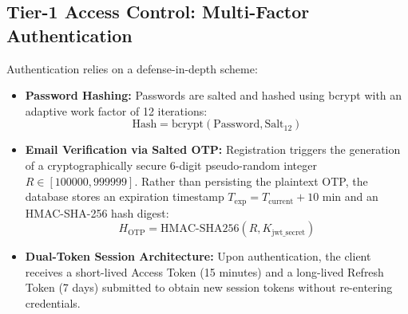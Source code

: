 \documentclass[conference]{IEEEtran}
\begin{document}
\subsection{Tier-1 Access Control: Multi-Factor Authentication}
Authentication relies on a defense-in-depth scheme:
\begin{itemize}
    \item \textbf{Password Hashing:} Passwords are salted and hashed using bcrypt with an adaptive work factor of 12 iterations:
    \begin{equation}
        \text{Hash} = \text{bcrypt}(\text{Password}, \text{Salt}_{12})
    \end{equation}
    \item \textbf{Email Verification via Salted OTP:} Registration triggers the generation of a cryptographically secure 6-digit pseudo-random integer $R \in [100000, 999999]$. Rather than persisting the plaintext OTP, the database stores an expiration timestamp $T_{\text{exp}} = T_{\text{current}} + 10\text{ min}$ and an HMAC-SHA-256 hash digest:
    \begin{equation}
        H_{\text{OTP}} = \text{HMAC-SHA256}(R, K_{\text{jwt\_secret}})
    \end{equation}
    \item \textbf{Dual-Token Session Architecture:} Upon authentication, the client receives a short-lived Access Token (15 minutes) and a long-lived Refresh Token (7 days) submitted to obtain new session tokens without re-entering credentials.
\end{itemize}
\end{document}
